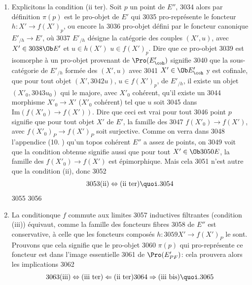 \begin{enumerate}
\begin{itemize}
  3024	  puisque pour $X'$ fixé, la famille des $u : X''\to
  3025	  f(X')$\pageoriginale de source un objet cohérent est épimorphique, de sorte qu'il en est a fortiori
  3026	  ainsi de la famille de tous les $f(v'_{\alpha})$ dans les
  3027	  diagrammes correspondants $(\ast)$. Donc
  3028	$$
  3029	{\rm(iv)} \Rightarrow {\rm(i)}{\quoi}.
  3030	$$
  3031	\end{itemize}
  3032	
  3033	\item Explicitons la condition (ii ter). Soit $p$ un point de $E''$,
  3034	  alors par définition $\pi(p)$ est le pro-objet de $E'$ qui
  3035	  pro-représente le foncteur $h : X'\to f(X')_{p}$, ou encore la
  3036	  pro-objet défini par le foncteur canonique $E'_{/h} \to E'$, où
  3037	  $E'_{/h}$  désigne la catégorie des couples $(X', u)$, avec $X'\in
  3038	  \Ob E'$ et $u \in h(X')$ \ie $u \in f(X')_p$. Dire que ce pro-objet
  3039	  est isomorphe à un pro-objet provenant de $\Pro(E'_{\coh})$ signifie
  3040	  que la sous-catégorie de $E'_{/h}$ formée des $(X', u)$ avec
  3041	  $X'\in \Ob E'_{\coh}$  y est cofinale, \ie que pour tout objet $(X',
  3042	  u)$, $u \in f(X')_p$, de $E'_{/h}$, il existe un objet $(X'_0,
  3043	  u_0)$ qui le majore, avec $X'_0$ cohérent, \ie qu'il existe un
  3044	  morphisme $X'_0 \to X'$ ($X'_0$ cohérent) tel que $u$ soit
  3045	  dans $\text{Im}(f(X'_0) \to f(X'))$. Dire que ceci est vrai pour tout
  3046	  point $p$ signifie que pour tout objet $X'$ de $E'$, la famille des
  3047	$f(X'_{0})\to f(X')$, avec   $f(X'_0)_P \to f(X')_P$ soit surjective. Comme on verra dans
  3048	  l'appendice (10. ) qu'un topos cohérent $E''$ a assez de points, on
  3049	  voit que la condition obtenue signifie aussi que pour tout $X'\in \Ob
  3050	  E$, la famille des $f(X'_0) \to f(X')$ est épimorphique. Mais cela
  3051	  n'est autre que la condition (ii), donc
  3052	$$
  3053	{\rm(ii)} \Leftrightarrow \text{(ii ter)}{\quoi}.
  3054	$$
  3055	
  3056	\item La condition\pageoriginale que $f$ commute aux limites
  3057	  inductives filtrantes   (condition (iii)) équivaut, comme la famille des foncteurs fibres
  3058	  de $E''$ est conservative, à celle que les foncteurs composés $h :
  3059	  X'\to f(X')_P$ le sont. Prouvons que cela signifie que le pro-objet
  3060	  $\pi(p)$ qui pro-représente ce foncteur est dans l'image essentielle
  3061	  de $\Pro(E'_{PF})$: cela prouvera alors les implications
  3062	$$
  3063	{\rm(iii)} \Leftrightarrow \text{(iii ter)} \Leftarrow \text{(ii ter)}
  3064	\Rightarrow \text{(iii bis)}{\quoi}.
  3065	$$

\end{enumerate}

